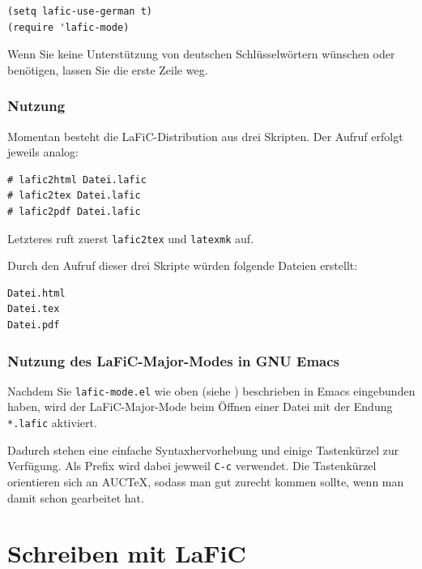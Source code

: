 \documentclass{scrartcl}
\begin{document}
\begin{verbatim}
(setq lafic-use-german t)
(require 'lafic-mode)
\end{verbatim}


{Wenn Sie keine Unterstützung von deutschen Schlüsselwörtern
wünschen oder benötigen, lassen Sie die erste Zeile weg.\\}

\section{Nutzung}

{Momentan besteht die LaFiC-Distribution aus drei
Skripten. Der Aufruf erfolgt jeweils analog:\\}

\begin{verbatim}
# lafic2html Datei.lafic
# lafic2tex Datei.lafic
# lafic2pdf Datei.lafic
\end{verbatim}


{Letzteres ruft zuerst \texttt{lafic2tex} und \texttt{latexmk} auf.\\}

{Durch den Aufruf dieser drei Skripte würden folgende Dateien
erstellt:\\}

\begin{verbatim}
Datei.html
Datei.tex
Datei.pdf
\end{verbatim}


\section{Nutzung des LaFiC-Major-Modes in GNU Emacs}

{Nachdem Sie \texttt{lafic-mode.el} wie oben (siehe \xspace )
beschrieben in Emacs eingebunden haben, wird der
LaFiC-Major-Mode beim Öffnen einer Datei mit der Endung
\texttt{*.lafic} aktiviert.\\}

{Dadurch stehen eine einfache Syntaxhervorhebung und einige
Tastenkürzel zur Verfügung. Als Prefix wird dabei jewweil
\texttt{C-c} verwendet. Die Tastenkürzel orientieren sich an AUCTeX,
sodass man gut zurecht kommen sollte, wenn man damit schon
gearbeitet hat.\\}

\part{Schreiben mit LaFiC}
\end{document}
